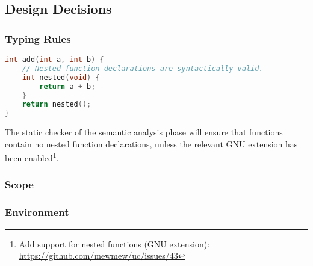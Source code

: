 \subsection{Design Decisions}

\subsubsection{Typing Rules}

\begin{lstlisting}[language=C,style=c,caption={\label{fig:nested_func_decl}Nested function declarations.}]
int add(int a, int b) {
	// Nested function declarations are syntactically valid.
	int nested(void) {
		return a + b;
	}
	return nested();
}
\end{lstlisting}

The static checker of the semantic analysis phase will ensure that functions contain no nested function declarations, unless the relevant GNU extension has been enabled\footnote{Add support for nested functions (GNU extension): \url{https://github.com/mewmew/uc/issues/43}}.

\subsubsection{Scope}


\subsubsection{Environment}
